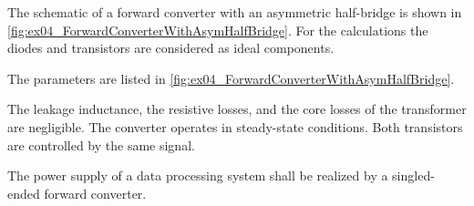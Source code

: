 

The schematic of a forward converter with an asymmetric half-bridge is shown in \autoref{fig:ex04_ForwardConverterWithAsymHalfBridge}. 
For the calculations the diodes and transistors are considered as ideal components.



The parameters are listed in \autoref{fig:ex04_ForwardConverterWithAsymHalfBridge}.


\FloatBarrier
The leakage inductance, the resistive losses, and the core losses of the transformer are negligible. 
The converter operates in steady-state conditions. Both transistors are controlled by the same signal.






The power supply of a data processing system shall be realized by a singled-ended forward converter.

